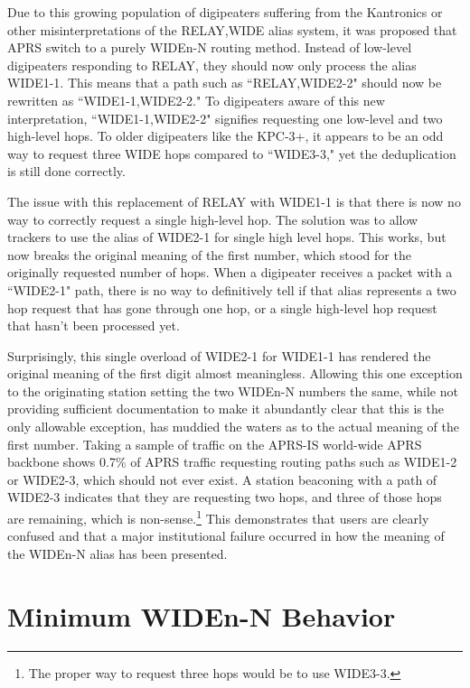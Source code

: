 Due to this growing population of digipeaters suffering from the Kantronics or other
misinterpretations of the RELAY,WIDE alias system, 
it was proposed that APRS switch to a purely WIDEn-N routing method. 
Instead of low-level digipeaters responding to RELAY,
they should now only process the alias WIDE1-1.
This means that a path such as ``RELAY,WIDE2-2" should now be rewritten as
``WIDE1-1,WIDE2-2." 
To digipeaters aware of this new interpretation, ``WIDE1-1,WIDE2-2" signifies 
requesting one low-level and two high-level hops.
To older digipeaters like the KPC-3+, it appears to be an odd way to request
three WIDE hops compared to ``WIDE3-3," 
yet the deduplication is still done correctly.

The issue with this replacement of RELAY with WIDE1-1 is that there is now
no way to correctly request a single high-level hop.
The solution was to allow trackers to use the alias of WIDE2-1 for single
high level hops.
This works, but now breaks the original meaning of the first number,
which stood for the originally requested number of hops.
When a digipeater receives a packet with a ``WIDE2-1" path, 
there is no way to definitively
tell if that alias represents a two hop request that has gone through one hop,
or a single high-level hop request that hasn't been processed yet.

Surprisingly, this single overload of WIDE2-1 for WIDE1-1 has rendered the
original meaning of the first digit almost meaningless.
Allowing this one exception to the originating station setting the two WIDEn-N
numbers the same, while not providing sufficient documentation
to make it abundantly clear that this is the only allowable exception,
has muddied the waters as to the actual meaning of the first number.
Taking a sample of traffic on the APRS-IS world-wide APRS backbone shows
0.7\% of APRS traffic requesting routing paths such as WIDE1-2 or WIDE2-3,
which should not ever exist.
A station beaconing with a path of WIDE2-3 indicates that they are requesting
two hops, and three of those hops are remaining, which is non-sense.\footnote{The
proper way to request three hops would be to use WIDE3-3.}
This demonstrates that users are clearly confused and that a
major institutional failure occurred in how the meaning of the WIDEn-N alias has
been presented.

\section{Minimum WIDEn-N Behavior}

